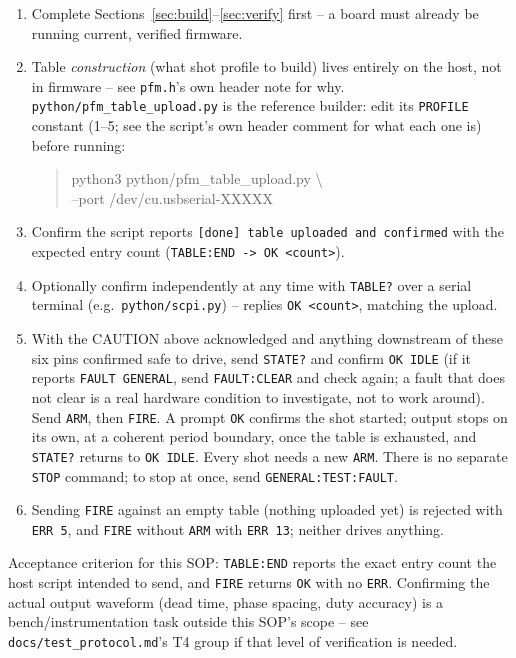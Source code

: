 \documentclass[11pt]{article}
\newcommand{\code}[1]{\texttt{#1}}
\begin{document}
\begin{enumerate}[label=\arabic*.]
  \item Complete Sections~\ref{sec:build}--\ref{sec:verify} first --
    a board must already be running current, verified firmware.
  \item Table \emph{construction} (what shot profile to build) lives
    entirely on the host, not in firmware -- see \code{pfm.h}'s own
    header note for why. \code{python/pfm\_table\_upload.py} is the
    reference builder: edit its \code{PROFILE} constant (1--5; see the
    script's own header comment for what each one is) before running:
\begin{quote}\ttfamily\small\raggedright
python3 python/pfm\_table\_upload.py \textbackslash\\
\hspace*{1em}--port /dev/cu.usbserial-XXXXX
\end{quote}
  \item Confirm the script reports \code{[done] table uploaded and
    confirmed} with the expected entry count (\code{TABLE:END -> OK
    <count>}).
  \item Optionally confirm independently at any time with \code{TABLE?}
    over a serial terminal (e.g.\ \code{python/scpi.py}) -- replies
    \code{OK <count>}, matching the upload.
  \item With the CAUTION above acknowledged and anything downstream of
    these six pins confirmed safe to drive, send \code{STATE?} and
    confirm \code{OK IDLE} (if it reports \code{FAULT GENERAL}, send
    \code{FAULT:CLEAR} and check again; a fault that does not clear is a
    real hardware condition to investigate, not to work around). Send
    \code{ARM}, then \code{FIRE}. A prompt \code{OK} confirms the shot
    started; output stops on its own, at a coherent period boundary, once
    the table is exhausted, and \code{STATE?} returns to \code{OK IDLE}.
    Every shot needs a new \code{ARM}. There is no separate \code{STOP}
    command; to stop at once, send \code{GENERAL:TEST:FAULT}.
  \item Sending \code{FIRE} against an empty table (nothing uploaded
    yet) is rejected with \code{ERR 5}, and \code{FIRE} without
    \code{ARM} with \code{ERR 13}; neither drives anything.
\end{enumerate}

Acceptance criterion for this SOP: \code{TABLE:END} reports the exact
entry count the host script intended to send, and \code{FIRE} returns
\code{OK} with no \code{ERR}. Confirming the actual output waveform
(dead time, phase spacing, duty accuracy) is a bench/instrumentation
task outside this SOP's scope -- see \code{docs/test\_protocol.md}'s T4
group if that level of verification is needed.
\end{document}
